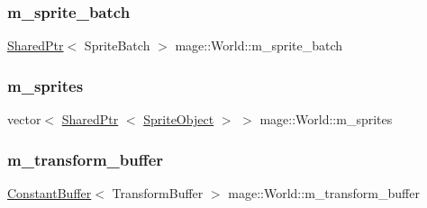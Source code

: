 \hypertarget{classmage_1_1_world_abb5d26cbfbd7b5792a53359b823c9f37}{}\label{classmage_1_1_world_abb5d26cbfbd7b5792a53359b823c9f37} 
\subsubsection{\texorpdfstring{m\+\_\+sprite\+\_\+batch}{m\_sprite\_batch}}
{\footnotesize\ttfamily \hyperlink{namespacemage_a1e01ae66713838a7a67d30e44c67703e}{Shared\+Ptr}$<$ Sprite\+Batch $>$ mage\+::\+World\+::m\+\_\+sprite\+\_\+batch\hspace{0.3cm}{\ttfamily [private]}}

\hypertarget{classmage_1_1_world_a2c769aca9f3394dc0f41473c5cd342a9}{}\label{classmage_1_1_world_a2c769aca9f3394dc0f41473c5cd342a9} 
\subsubsection{\texorpdfstring{m\+\_\+sprites}{m\_sprites}}
{\footnotesize\ttfamily vector$<$ \hyperlink{namespacemage_a1e01ae66713838a7a67d30e44c67703e}{Shared\+Ptr} $<$ \hyperlink{classmage_1_1_sprite_object}{Sprite\+Object} $>$ $>$ mage\+::\+World\+::m\+\_\+sprites\hspace{0.3cm}{\ttfamily [private]}}

\hypertarget{classmage_1_1_world_a538dbd911642f658266db42005bf157d}{}\label{classmage_1_1_world_a538dbd911642f658266db42005bf157d} 
\subsubsection{\texorpdfstring{m\+\_\+transform\+\_\+buffer}{m\_transform\_buffer}}
{\footnotesize\ttfamily \hyperlink{structmage_1_1_constant_buffer}{Constant\+Buffer}$<$ Transform\+Buffer $>$ mage\+::\+World\+::m\+\_\+transform\+\_\+buffer\hspace{0.3cm}{\ttfamily [private]}}


